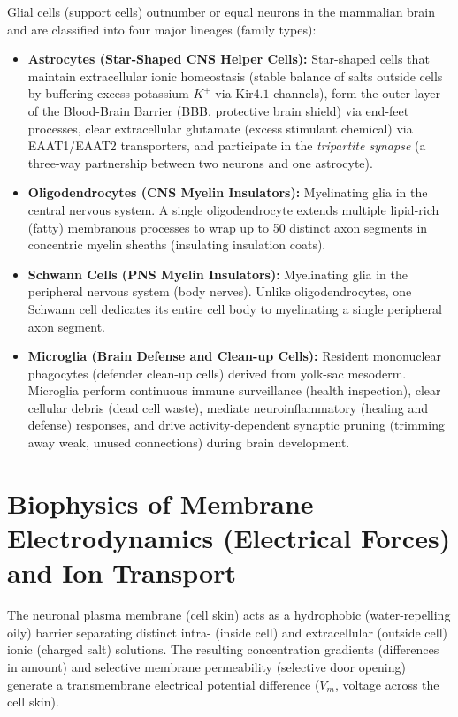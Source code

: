 \documentclass[10pt,journal,compsoc,onecolumn]{IEEEtran}
\begin{document}
Glial cells (support cells) outnumber or equal neurons in the mammalian brain and are classified into four major lineages (family types):

\begin{itemize}
    \item \textbf{Astrocytes (Star-Shaped CNS Helper Cells):} Star-shaped cells that maintain extracellular ionic homeostasis (stable balance of salts outside cells by buffering excess potassium $K^+$ via $\text{Kir}4.1$ channels), form the outer layer of the Blood-Brain Barrier (BBB, protective brain shield) via end-feet processes, clear extracellular glutamate (excess stimulant chemical) via EAAT1/EAAT2 transporters, and participate in the \emph{tripartite synapse} (a three-way partnership between two neurons and one astrocyte).
    \item \textbf{Oligodendrocytes (CNS Myelin Insulators):} Myelinating glia in the central nervous system. A single oligodendrocyte extends multiple lipid-rich (fatty) membranous processes to wrap up to 50 distinct axon segments in concentric myelin sheaths (insulating insulation coats).
    \item \textbf{Schwann Cells (PNS Myelin Insulators):} Myelinating glia in the peripheral nervous system (body nerves). Unlike oligodendrocytes, one Schwann cell dedicates its entire cell body to myelinating a single peripheral axon segment.
    \item \textbf{Microglia (Brain Defense and Clean-up Cells):} Resident mononuclear phagocytes (defender clean-up cells) derived from yolk-sac mesoderm. Microglia perform continuous immune surveillance (health inspection), clear cellular debris (dead cell waste), mediate neuroinflammatory (healing and defense) responses, and drive activity-dependent synaptic pruning (trimming away weak, unused connections) during brain development.
\end{itemize}

\section{Biophysics of Membrane Electrodynamics (Electrical Forces) and Ion Transport}
\label{sec:biophysics}

The neuronal plasma membrane (cell skin) acts as a hydrophobic (water-repelling oily) barrier separating distinct intra- (inside cell) and extracellular (outside cell) ionic (charged salt) solutions. The resulting concentration gradients (differences in amount) and selective membrane permeability (selective door opening) generate a transmembrane electrical potential difference ($V_m$, voltage across the cell skin).
\end{document}
